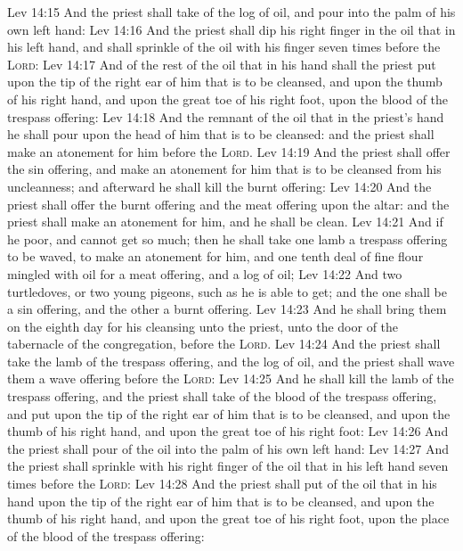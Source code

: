 \vs Lev 14:15 And the priest shall take  of the log of oil, and pour  into the palm of his own left hand:
\vs Lev 14:16 And the priest shall dip his right finger in the oil that  in his left hand, and shall sprinkle of the oil with his finger seven times before the \textsc{Lord}:
\vs Lev 14:17 And of the rest of the oil that  in his hand shall the priest put upon the tip of the right ear of him that is to be cleansed, and upon the thumb of his right hand, and upon the great toe of his right foot, upon the blood of the trespass offering:
\vs Lev 14:18 And the remnant of the oil that  in the priest's hand he shall pour upon the head of him that is to be cleansed: and the priest shall make an atonement for him before the \textsc{Lord}.
\vs Lev 14:19 And the priest shall offer the sin offering, and make an atonement for him that is to be cleansed from his uncleanness; and afterward he shall kill the burnt offering:
\vs Lev 14:20 And the priest shall offer the burnt offering and the meat offering upon the altar: and the priest shall make an atonement for him, and he shall be clean.
\vs Lev 14:21 And if he  poor, and cannot get so much; then he shall take one lamb  a trespass offering to be waved, to make an atonement for him, and one tenth deal of fine flour mingled with oil for a meat offering, and a log of oil;
\vs Lev 14:22 And two turtledoves, or two young pigeons, such as he is able to get; and the one shall be a sin offering, and the other a burnt offering.
\vs Lev 14:23 And he shall bring them on the eighth day for his cleansing unto the priest, unto the door of the tabernacle of the congregation, before the \textsc{Lord}.
\vs Lev 14:24 And the priest shall take the lamb of the trespass offering, and the log of oil, and the priest shall wave them  a wave offering before the \textsc{Lord}:
\vs Lev 14:25 And he shall kill the lamb of the trespass offering, and the priest shall take  of the blood of the trespass offering, and put  upon the tip of the right ear of him that is to be cleansed, and upon the thumb of his right hand, and upon the great toe of his right foot:
\vs Lev 14:26 And the priest shall pour of the oil into the palm of his own left hand:
\vs Lev 14:27 And the priest shall sprinkle with his right finger  of the oil that  in his left hand seven times before the \textsc{Lord}:
\vs Lev 14:28 And the priest shall put of the oil that  in his hand upon the tip of the right ear of him that is to be cleansed, and upon the thumb of his right hand, and upon the great toe of his right foot, upon the place of the blood of the trespass offering:
